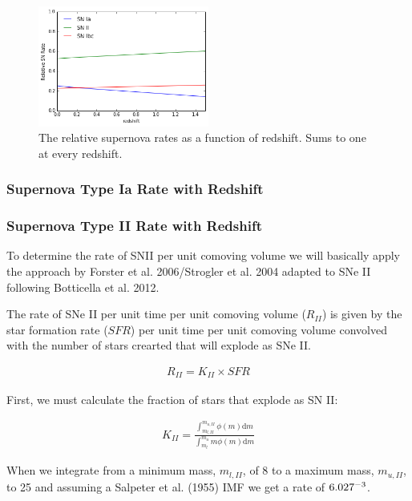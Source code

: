 \documentclass[12pt, onecolumn]{emulateapj}
\begin{document}
\begin{figure}
	\begin{center}
		\includegraphics[width=0.5\textwidth]{relative_supernova_rate.png}
		\caption{The relative supernova rates as a function of redshift. Sums to one at every redshift.}
		\label{fig:realtive_supernova_rates}
	\end{center}
\end{figure}

\subsubsection{Supernova Type Ia Rate with Redshift}
\label{sec:TypeIaRate}

\subsubsection{Supernova Type II Rate with Redshift}
\label{sec:TypeIIRate}

To determine the rate of SNII per unit comoving volume we will basically apply the approach by Forster et al. 2006/Strogler et al. 2004 adapted to SNe II following Botticella et al. 2012.

The rate of SNe II per unit time per unit comoving volume ($R_{II}$) is given by the star formation rate ($SFR$) per unit time per unit comoving volume convolved with the number of stars crearted that will explode as SNe II.

\begin{align}
	\label{eq:rateII}
	R_{II} = K_{II} \times SFR
\end{align}

First, we must calculate the fraction of stars that explode as SN II:

\begin{align}
\label{eq:rateII}
K_{II} = \frac{\int_{m_{l,II}}^{m_{u,II}} \phi(m) \mathrm{d}m}{\int_{m_{l}}^{m_{u}} m\phi(m) \mathrm{d}m}
\end{align}

When we integrate from a minimum mass, $m_{l,II}$, of 8 to a maximum mass, $m_{u,II}$, to 25 and assuming a Salpeter et al. (1955) IMF we get a rate of $6.027 \time 10^{-3}$.
\end{document}
